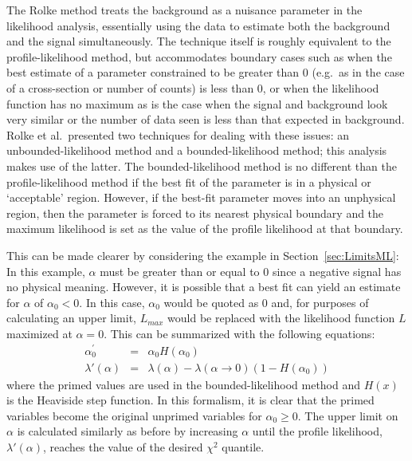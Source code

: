 The Rolke method treats the background as a nuisance parameter in the likelihood analysis, essentially using the data to estimate both the background and the signal simultaneously.  The technique itself is roughly equivalent to the profile-likelihood method, but accommodates boundary cases such as when the best estimate of a parameter constrained to be greater than 0 (e.g.~as in the case of a cross-section or number of counts) is less than 0, or when the likelihood function has no maximum as is the case when the signal and background look very similar or the number of data seen is less than that expected in background.  Rolke et al.~presented two techniques for dealing with these issues: an unbounded-likelihood method and a bounded-likelihood method; this analysis makes use of the latter.  The bounded-likelihood method is no different than the profile-likelihood method if the best fit of the parameter is in a physical or `acceptable' region.  However, if the best-fit parameter moves into an unphysical region, then the parameter is forced to its nearest physical boundary and the maximum likelihood is set as the value of the profile likelihood at that boundary.  

This can be made clearer by considering the example in Section~\ref{sec:LimitsML}:  In this example, $\alpha$ must be greater than or equal to 0 since a negative signal has no physical meaning.  However, it is possible that a best fit can yield an estimate for $\alpha$ of $\alpha_{0}<0$.  In this case, $\alpha_{0}$ would be quoted as 0 and, for purposes of calculating an upper limit, $L_{max}$ would be replaced with the likelihood function $L$ maximized at $\alpha = 0$.  This can be summarized with the following equations:
		\begin{equation}
			\begin{array}{rcl}
				\alpha_0^{\prime} & = & \alpha_0 H (\alpha_0) \\
				\lambda' (\alpha) & = & \lambda(\alpha) - \lambda(\alpha \to 0) (1 - H(\alpha_0))
			\end{array}
		\end{equation}
where the primed values are used in the bounded-likelihood method and $H(x)$ is the Heaviside step function.  In this formalism, it is clear that the primed variables become the original unprimed variables for $\alpha_{0}\geq0$.  The upper limit on $\alpha$ is calculated similarly as before by increasing $\alpha$ until the profile likelihood, $\lambda'(\alpha)$, reaches the value of the desired $\chi^{2}$ quantile. 

